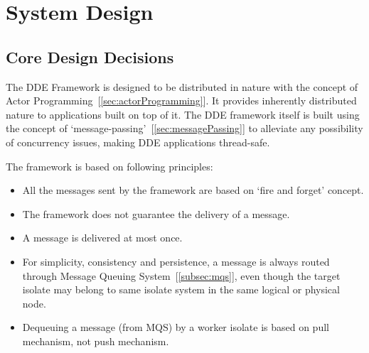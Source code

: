 \chapter{System Design}
\label{chapter:system_design}

\section{Core Design Decisions}
  The DDE Framework is designed to be distributed in nature with the concept of Actor Programming~[\autoref{sec:actorProgramming}]. It provides inherently distributed nature to applications built on top of it. The DDE framework itself is built using the concept of ‘message-passing’~[\autoref{sec:messagePassing}] to alleviate any possibility of concurrency issues, making DDE applications thread-safe.

  The framework is based on following principles:
\begin{itemize}
  \item All the messages sent by the framework are based on ‘fire and forget’ concept.
  \item The framework does not guarantee the delivery of a message.
  \item A message is delivered at most once.
  \item For simplicity, consistency and persistence, a message is always routed through Message Queuing System~[\autoref{subsec:mqs}], even though the target isolate may belong to same isolate system in the same logical or physical node.
  \item Dequeuing a message (from MQS) by a worker isolate is based on pull mechanism, not push mechanism.
\end{itemize}

